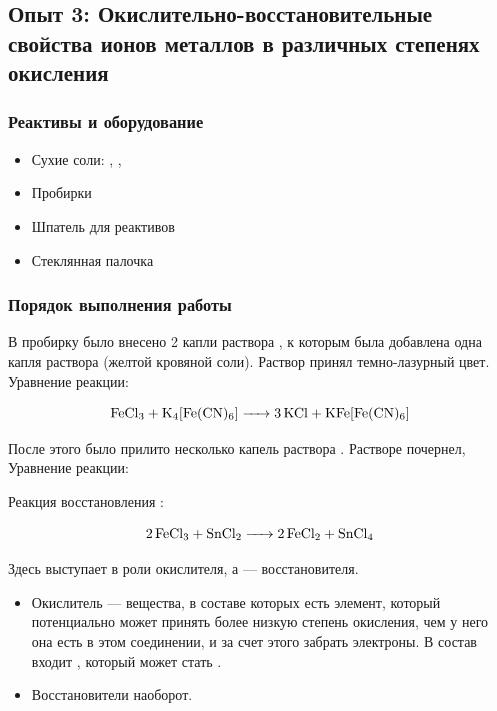 \documentclass[a4paper, 12pt]{article}
\begin{document}
\subsection{Опыт 3: Окислительно-восстановительные свойства ионов металлов в различных степенях окисления}

\subsubsection{Реактивы и оборудование}

\begin{itemize}
	\item Сухие соли: , , 
	
	\item Пробирки
	\item Шпатель для реактивов
	\item Стеклянная палочка
\end{itemize}

\subsubsection{Порядок выполнения работы}

В пробирку было внесено 2 капли раствора , к которым была добавлена одна капля раствора  (желтой кровяной соли). Раствор принял темно-лазурный цвет. Уравнение реакции:

\begin{equation}
	\ce{FeCl3 + K4[Fe(CN)6] -> 3KCl + KFe[Fe(CN)6]}
\end{equation}

После этого было прилито несколько капель раствора . Растворе почернел,  Уравнение реакции:

Реакция восстановления :

\begin{equation}
	\ce{2 FeCl3 + SnCl2 -> 2FeCl2 + SnCl4}
\end{equation}

Здесь  выступает в роли окислителя, а  --- восстановителя.

\begin{itemize}
	\item Окислитель --- вещества, в составе которых есть элемент, который потенциально может принять более низкую степень окисления, чем у него она есть в этом соединении, и за счет этого забрать электроны. В состав  входит , который может стать .
	
	\item Восстановители наоборот.
\end{itemize}
\end{document}

